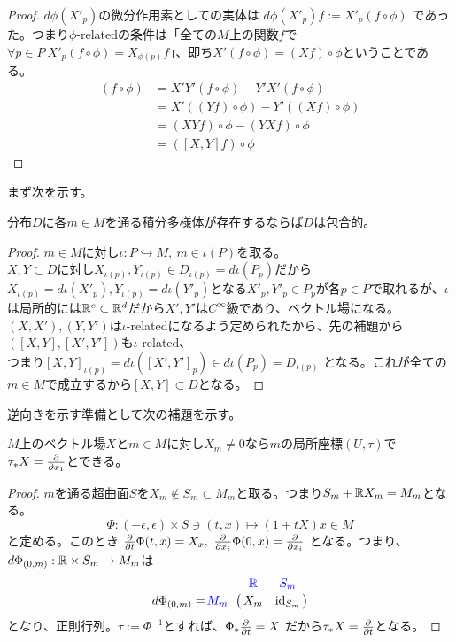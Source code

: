 \begin{proof}
    $d\phi(X'_p)$の微分作用素としての実体は $d\phi(X'_p)f:=X'_p(f\circ\phi)$ であった。つまり$\phi$-relatedの条件は「全ての$M$上の関数$f$で$\forall p\in P\ X'_p(f\circ\phi)=X_{\phi(p)}f$」、即ち$X'(f\circ\phi)=(Xf)\circ\phi$ということである。
    \begin{align*}
        [X',Y'](f\circ\phi)&=X'Y'(f\circ\phi)-Y'X'(f\circ\phi)\\
        &=X'((Yf)\circ\phi)-Y'((Xf)\circ\phi)\\
        &=(XYf)\circ\phi-(YXf)\circ\phi\\
        &=([X,Y]f)\circ\phi
    \end{align*}
\end{proof}
まず次を示す。
\begin{thm}[Frobeniusの定理（前半）]\label{thm:122}
    分布$D$に各$m\in M$を通る積分多様体が存在するならば$D$は包合的。
\end{thm}
\begin{proof}
    $m\in M$に対し$\iota:P\hookrightarrow M,\ m\in\iota(P)$を取る。\\
    $X,Y\subset D$に対し$X_{\iota(p)},Y_{\iota(p)}\in D_{\iota(p)}=d\iota(P_p)$だから$X_{\iota(p)}=d\iota(X'_p),Y_{\iota(p)}=d\iota(Y'_p)$となる$X'_p,Y'_p\in P_p$が各$p\in P$で取れるが、$\iota$は局所的には$\mathbb{R}^c\subset\mathbb{R}^d$だから$X',Y'$は$C^\infty$級であり、ベクトル場になる。\\
    $(X,X'),(Y,Y')$は$\iota$-relatedになるよう定められたから、先の補題から$([X,Y],[X',Y'])$も$\iota$-related、\\
    つまり$[X,Y]_{\iota(p)}=d\iota([X',Y']_p)\in d\iota(P_p)=D_{\iota(p)}$ となる。これが全ての$m\in M$で成立するから$[X,Y]\subset D$となる。
\end{proof}
逆向きを示す準備として次の補題を示す。
\begin{lem}
    $M$上のベクトル場$X$と$m\in M$に対し$X_m\neq0$なら$m$の局所座標$(U,\tau)$で$\tau_*X=\frac{\partial }{\partial x_1}$とできる。
\end{lem}
\begin{proof}
    $m$を通る超曲面$S$を$X_m\notin S_m\subset M_m$と取る。つまり$S_m+\mathbb{R} X_m=M_m$となる。\\
    \[\Phi:(-\epsilon,\epsilon)\times S\ni(t,x)\longmapsto(1+t X)x\in M\]
    と定める。このとき $\pdiff{}{t}\Phi(t,x)=X_x,\ \pdiff{}{x_i}\Phi(0,x)=\pdiff{}{x_i}$ となる。つまり、$d\Phi_{(0,m)}:\mathbb{R}\times S_m\to M_m$は
    \[d\Phi_{(0,m)}=\bordermatrix{
        & \color{blue}\R & \color{blue}S_m\cr
        \color{blue}M_m & X_m & \id_{S_m}\cr
    }\]
    となり、正則行列。$\tau:=\Phi^{-1}$とすれば、$\Phi_*\frac{\partial }{\partial t}=X$ だから$\tau_*X=\frac{\partial }{\partial t}$となる。
\end{proof}
